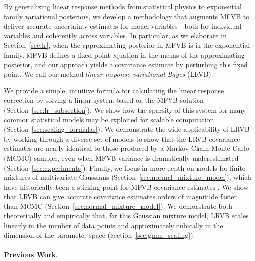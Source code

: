 \documentclass{article}\usepackage[]{graphicx}\usepackage[]{color}
\newcommand{\mysec}[1]{Section~\ref{sec:#1}}
\begin{document}
By generalizing linear response methods from statistical physics
\citep{parisi:1988:statistical, opper:2003:variational, opper:2001:advancedmeanfield, tanaka:2000:information}
to exponential family variational posteriors, we develop a methodology that
augments MFVB to deliver accurate uncertainty estimates for model
variables---both for individual variables and coherently across variables. In
particular, as we elaborate in \mysec{lr}, when the approximating posterior in
MFVB is in the exponential family, MFVB defines a fixed-point equation in the
means of the approximating posterior, and our approach yields a covariance
estimate by perturbing this fixed point. We call our method \emph{linear
response variational Bayes} (LRVB).

We provide a simple, intuitive formula for calculating the linear response
correction by solving a linear system based on the MFVB solution
(\mysec{lr_subsection}). We show how the sparsity of this system for many common
statistical models may be exploited for scalable computation
(\mysec{scaling_formulas}). We demonstrate the wide applicability of LRVB by
working through a diverse set of models to show that the LRVB covariance
estimates are nearly identical to those produced by a Markov Chain Monte Carlo
(MCMC) sampler, even when MFVB variance is dramatically underestimated
(\mysec{experiments}). Finally, we focus in more depth on models for finite
mixtures of multivariate Gaussians (\mysec{normal_mixture_model}), which have
historically been a sticking point for MFVB covariance estimates
\citep{bishop:2006:pattern,turner:2011:two}. We show that LRVB can give accurate
covariance estimates orders of magnitude faster than MCMC
(\mysec{normal_mixture_model}). We demonstrate both theoretically and
empirically that, for this Gaussian mixture model, LRVB scales linearly in the
number of data points and approximately cubically in the dimension of the
parameter space (\mysec{gmm_scaling}).

\paragraph{Previous Work.}
\end{document}
